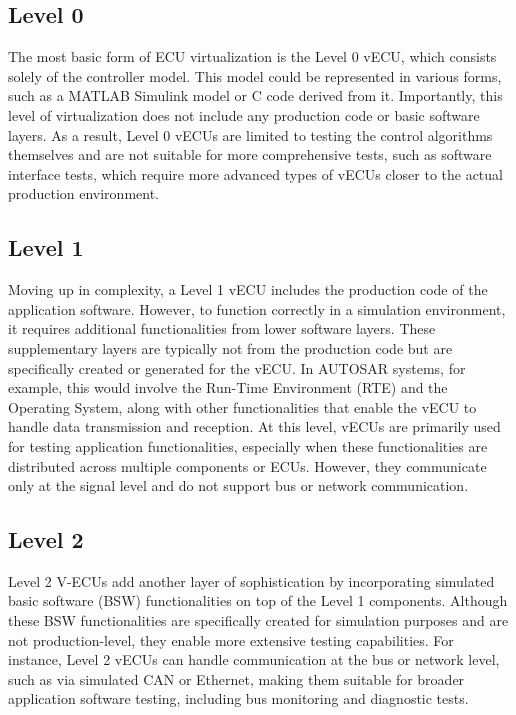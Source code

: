 \subsection{Level 0}
The most basic form of ECU virtualization is the Level 0 vECU, which consists solely of the controller model. This model could be represented in various forms, such as a MATLAB Simulink model or C code derived from it. Importantly, this level of virtualization does not include any production code or basic software layers. As a result, Level 0 vECUs are limited to testing the control algorithms themselves and are not suitable for more comprehensive tests, such as software interface tests, which require more advanced types of vECUs closer to the actual production environment.

\subsection{Level 1}
Moving up in complexity, a Level 1 vECU includes the production code of the application software. However, to function correctly in a simulation environment, it requires additional functionalities from lower software layers. These supplementary layers are typically not from the production code but are specifically created or generated for the vECU. In AUTOSAR systems, for example, this would involve the Run-Time Environment (RTE) and the Operating System, along with other functionalities that enable the vECU to handle data transmission and reception. At this level, vECUs are primarily used for testing application functionalities, especially when these functionalities are distributed across multiple components or ECUs. However, they communicate only at the signal level and do not support bus or network communication.

\subsection{Level 2}
Level 2 V-ECUs add another layer of sophistication by incorporating simulated basic software (BSW) functionalities on top of the Level 1 components. Although these BSW functionalities are specifically created for simulation purposes and are not production-level, they enable more extensive testing capabilities. For instance, Level 2 vECUs can handle communication at the bus or network level, such as via simulated CAN or Ethernet, making them suitable for broader application software testing, including bus monitoring and diagnostic tests.

